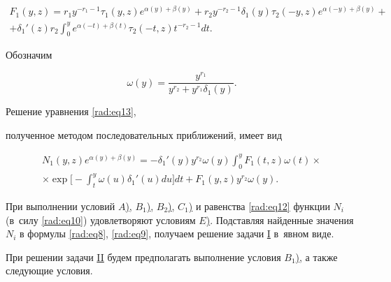 \begin{multline*}

 F_1(y,z) = r_1 y^{-r_1-1} \tau_1(y,z) e^{\alpha(y)+\beta(y)} + r_2 y^{-r_2-1} \delta_1(y)\tau_2(-y,z) e^{\alpha(-y)+\beta(y)} + 

 \\

 + \delta_1'(z) r_2  \int _0^y e^{\alpha(-t)+\beta(t)} \tau_2(-t,z) t^{-r_2-1} dt. 

 \end{multline*}



Обозначим 

$$\omega(y)=\displaystyle{\frac{y^{r_1}}{y^{r_2}+y^{r_1}\delta_1(y)}}.$$ 

Решение уравнения \eqref{rad:eq13},

полученное методом последовательных приближений,  имеет вид

\begin{multline*}

 N_1(y,z) e^{\alpha(y)+\beta(y)} = - \delta_1'(y) y^{r_2} \omega(y)  \int _0^y F_1(t,z) \omega(t)  \times \\

 \times \exp\biggl[ -  \int _t^y \omega(u)\delta_1'(u) du\biggr] dt + F_1(y,z) y^{r_2} \omega(y). 

 \end{multline*}



При выполнении условий \hyperlink{rad:A}{$A$)}, \hyperlink{rad:B1}{$B_1$)}, \hyperlink{rad:B1}{$B_2$)}, \hyperlink{rad:C1}{$C_1$)} и равенства \eqref{rad:eq12}  функции $N_i$ (в~силу \eqref{rad:eq10}) удовлетворяют условиям \hyperlink{rad:E}{$E$)}. Подставляя найденные значения $N_i$ в формулы \eqref{rad:eq8}, \eqref{rad:eq9}, получаем решение задачи \hyperlink{rad:task:I}{I} в~явном виде. 



При решении задачи \hyperlink{rad:task:II}{II} будем предполагать выполнение условия \hyperlink{rad:B1}{$B_1$)}, а также следующие условия.



